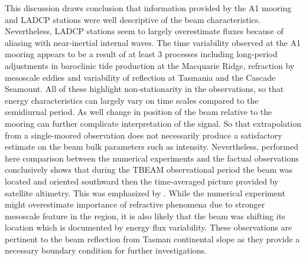 \documentclass[12pt]{article}
\begin{document}
This discussion draws conclusion that information provided by the A1 mooring and LADCP stations 
were well descriptive of the beam characteristics. Nevertheless, LADCP stations seem to 
largely overestimate fluxes because of aliasing with near-inertial internal waves. The time 
variability observed at the A1 mooring appears to be a result of at least 3 processes including 
long-period adjustments in baroclinic tide production at the Macquarie Ridge, refraction by 
mesoscale eddies and variability of reflection at Tasmania and the Cascade Seamount. All of these highlight 
non-stationarity in the observations, so that energy characteristics can largely vary on 
time scales compared to the semidiurnal period. As well change in position of the beam relative to 
the mooring can further complicate interpretation of the signal. So that extrapolation from a 
single-moored observation does not necessarily produce a satisfactory estimate on the beam bulk 
parameters such as intensity. Nevertheless, performed here comparison between the numerical 
experiments and the factual observations conclusively shows that during the TBEAM observational 
period the beam was located and oriented southward then the time-averaged picture provided 
by satellite altimetry. This was emphasized by . While the numerical experiment 
might overestimate importance of refractive phenomena due to stronger mesoscale feature in the 
region, it is also likely that the beam was shifting its location which is documented by energy 
flux variability. These observations are pertinent to the beam reflection from Tasman continental 
slope as they provide a necessary boundary condition for further investigations.
\end{document}
